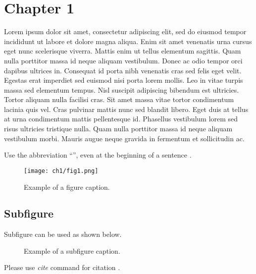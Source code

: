 \chapter{Chapter 1}
\label{chap:ch1}
Lorem ipsum dolor sit amet, consectetur adipiscing elit, sed do eiusmod tempor incididunt ut labore et dolore magna aliqua.
Enim sit amet venenatis urna cursus eget nunc scelerisque viverra.
Mattis enim ut tellus elementum sagittis.
Quam nulla porttitor massa id neque aliquam vestibulum.
Donec ac odio tempor orci dapibus ultrices in.
Consequat id porta nibh venenatis cras sed felis eget velit.
Egestas erat imperdiet sed euismod nisi porta lorem mollis.
Leo in vitae turpis massa sed elementum tempus.
Nisl suscipit adipiscing bibendum est ultricies.
Tortor aliquam nulla facilisi cras. Sit amet massa vitae tortor condimentum lacinia quis vel.
Cras pulvinar mattis nunc sed blandit libero.
Eget duis at tellus at urna condimentum mattis pellentesque id.
Phasellus vestibulum lorem sed risus ultricies tristique nulla.
Quam nulla porttitor massa id neque aliquam vestibulum morbi.
Mauris augue neque gravida in fermentum et sollicitudin ac.


Use the abbreviation ``'', even at the beginning of a sentence \cite{smit54}.

\begin{figure}[htbp]
 \centering
 \texttt{[image: ch1/fig1.png]}
 \caption{Example of a figure caption.}
\end{figure}


\section{Subfigure}
Subfigure can be used as shown below.

\begin{figure}[htbp]
 \centering
 \caption{Example of a subfigure caption.}
\end{figure}

Please use \textit{cite} command for citation \cite{colu92}.
